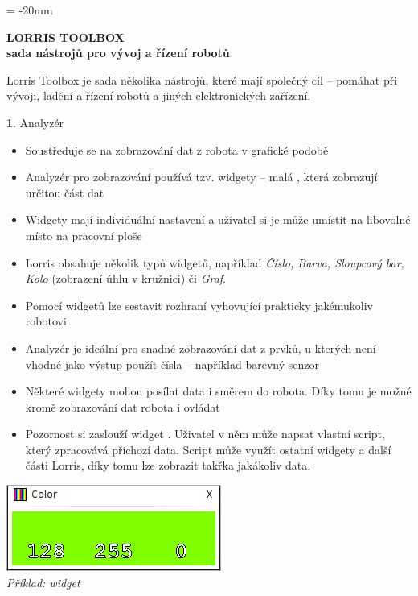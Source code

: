 \documentclass[12pt, a4paper, oneside]{article}
\newcommand{\B}{\textbf} %
\newcommand{\It}{\textit}  %
\begin{document}

\pagestyle{empty} %
 
\voffset = -20mm %
\enlargethispage{60mm} %

\begin{center}
    \Large \B{LORRIS TOOLBOX \\ sada nástrojů pro vývoj a řízení robotů}
\end{center}
\vspace{5mm}
\setlength{\footskip}{0pt}
\setlength{\textheight}{750pt}

Lorris Toolbox je sada několika nástrojů, které mají společný cíl -- pomáhat při vývoji, ladění a řízení robotů a jiných elektronických zařízení.

{\large \B 1. Analyzér }
\begin{itemize}
    \item Soustřeďuje se na zobrazování dat z robota v grafické podobě
    \item Analyzér pro zobrazování používá tzv. widgety -- malá , která zobrazují určitou část dat
    \item Widgety mají individuální nastavení a uživatel si je může umístit na libovolné místo na pracovní ploše
    \item Lorris obsahuje několik typů widgetů, například \It{ Číslo, Barva, Sloupcový bar, Kolo} (zobrazení úhlu v kružnici) či \It{Graf}.
    \item Pomocí widgetů lze sestavit rozhraní vyhovující prakticky jakémukoliv robotovi
    \item Analyzér je ideální pro snadné zobrazování dat z prvků, u kterých není vhodné jako výstup použít čísla -- například barevný senzor
    \item Některé widgety mohou posílat data i směrem do robota. Díky tomu je možné kromě zobrazování dat robota i ovládat
    \item Pozornost si zaslouží widget . Uživatel v něm může napsat vlastní script, který zpracovává příchozí data. Script může využít ostatní widgety a další části Lorris, díky tomu lze zobrazit takřka jakákoliv data.
\end{itemize}
\begin{center}
\includegraphics{img/color.png} \\
\It{Příklad: widget }
\end{center}
\end{document}
